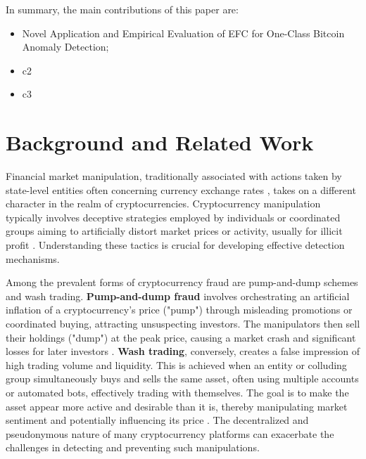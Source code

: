 \documentclass[12pt]{article}
\begin{document}
In summary, the main contributions of this paper are:

\begin{itemize}
    \item Novel Application and Empirical Evaluation of EFC for One-Class Bitcoin Anomaly Detection;
    \item c2
    \item c3
\end{itemize}

\section{Background and Related Work} \label{sec:background}
Financial market manipulation, traditionally associated with actions taken by state-level entities often concerning currency
exchange rates \cite{domanski2011currency, market_manipulation_detection_2022}, takes on a different character in the realm
of cryptocurrencies. Cryptocurrency manipulation typically involves deceptive strategies employed by individuals or coordinated
groups aiming to artificially distort market prices or activity, usually for illicit profit \cite{cryptocurrency_arket_manipulation_2021}.
Understanding these tactics is crucial for developing effective detection mechanisms.

Among the prevalent forms of cryptocurrency fraud are pump-and-dump schemes and wash trading. \textbf{Pump-and-dump fraud}
involves orchestrating an artificial inflation of a cryptocurrency's price ("pump") through misleading promotions or coordinated
buying, attracting unsuspecting investors. The manipulators then sell their holdings ("dump") at the peak price, causing
a market crash and significant losses for later investors \cite{karim2018manipulation}. \textbf{Wash trading}, conversely,
creates a false impression of high trading volume and liquidity. This is achieved when an entity or colluding group
simultaneously buys and sells the same asset, often using multiple accounts or automated bots, effectively trading with
themselves. The goal is to make the asset appear more active and desirable than it is, thereby manipulating market sentiment
and potentially influencing its price \cite{gandal2018price, edelman2018detecting}. The decentralized and pseudonymous
nature of many cryptocurrency platforms can exacerbate the challenges in detecting and preventing such manipulations.
\end{document}
